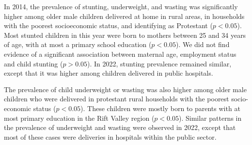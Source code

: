 \documentclass[sn-basic,Numbered,pdflatex]{sn-jnl}
\theoremstyle{remark}
\theoremstyle{definition}
\begin{document}
In 2014, the prevalence of stunting, underweight, and wasting was
significantly higher among older male children delivered at home in
rural areas, in households with the poorest socioeconomic status, and
identifying as Protestant (\(p < 0.05\)). Most stunted children in this
year were born to mothers between 25 and 34 years of age, with at most a
primary school education (\(p < 0.05\)). We did not find evidence of a
significant association between maternal age, employment status and
child stunting (\(p > 0.05\)). In 2022, stunting prevalence remained
similar, except that it was higher among children delivered in public
hospitals.

The prevalence of child underweight or wasting was also higher among
older male children who were delivered in protestant rural households
with the poorest socio-economic status (\(p < 0.05\)). These children
were mostly born to parents with at most primary education in the Rift
Valley region (\(p < 0.05\)). Similar patterns in the prevalence of
underweight and wasting were observed in 2022, except that most of these
cases were deliveries in hospitals within the public sector.

\renewcommand{\arraystretch}{0.8}
\end{document}
